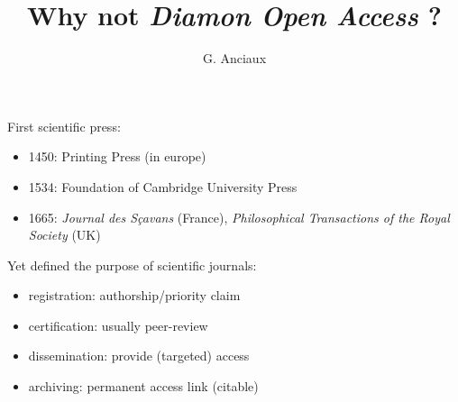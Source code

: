 \documentclass[10pt,compress,serif,aspectratio=169]{beamer}
\author[JTCAM]{G. Anciaux}
\title[JTCAM]{Why not \textit{Diamon Open Access} ?}
\begin{document}
\maketitle





\begin{frame}[t]%
 \vskip1cm%

{\large First scientific press:\newline}
 
 \begin{itemize}


 \item 1450: Printing Press (in europe)
 \item 1534: Foundation of Cambridge University Press
 \item 1665: \textit{Journal des Sçavans} (France), \textit{Philosophical Transactions of the Royal Society} (UK)\\
 \end{itemize}

 \vfill
{\large Yet defined the purpose of scientific journals:\newline}

\begin{itemize}
\item registration: authorship/priority claim
\item certification: usually peer-review
\item dissemination: provide (targeted) access
\item archiving: permanent access link (citable) 
\end{itemize}
\end{frame}
\end{document}
